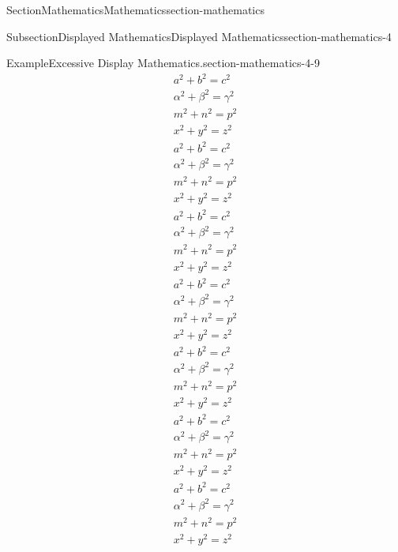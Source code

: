 \documentclass[twoside,10pt,]{article}
\numberwithin{equation}{section}
\begin{document}
\begin{sectionptx}{Section}{Mathematics}{}{Mathematics}{}{}{section-mathematics}
\begin{subsectionptx}{Subsection}{Displayed Mathematics}{}{Displayed Mathematics}{}{}{section-mathematics-4}
\begin{example}{Example}{Excessive Display Mathematics.}{section-mathematics-4-9}
\begin{gather}
a^2+b^2=c^2\label{section-mathematics-4-9-2-2-10}\\
\alpha^2+\beta^2=\gamma^2\label{section-mathematics-4-9-2-2-11}\\
m^2+n^2=p^2\label{section-mathematics-4-9-2-2-12}\\
x^2+y^2=z^2\label{section-mathematics-4-9-2-2-13}\\
a^2+b^2=c^2\label{section-mathematics-4-9-2-2-14}\\
\alpha^2+\beta^2=\gamma^2\label{section-mathematics-4-9-2-2-15}\\
m^2+n^2=p^2\label{section-mathematics-4-9-2-2-16}\\
x^2+y^2=z^2\label{section-mathematics-4-9-2-2-17}\\
a^2+b^2=c^2\label{section-mathematics-4-9-2-2-18}\\
\alpha^2+\beta^2=\gamma^2\label{section-mathematics-4-9-2-2-19}\\
m^2+n^2=p^2\label{section-mathematics-4-9-2-2-20}\\
x^2+y^2=z^2\label{section-mathematics-4-9-2-2-21}\\
a^2+b^2=c^2\label{section-mathematics-4-9-2-2-22}\\
\alpha^2+\beta^2=\gamma^2\label{section-mathematics-4-9-2-2-23}\\
m^2+n^2=p^2\label{section-mathematics-4-9-2-2-24}\\
x^2+y^2=z^2\label{section-mathematics-4-9-2-2-25}\\
a^2+b^2=c^2\label{section-mathematics-4-9-2-2-26}\\
\alpha^2+\beta^2=\gamma^2\label{section-mathematics-4-9-2-2-27}\\
m^2+n^2=p^2\label{section-mathematics-4-9-2-2-28}\\
x^2+y^2=z^2\label{section-mathematics-4-9-2-2-29}\\
a^2+b^2=c^2\label{section-mathematics-4-9-2-2-30}\\
\alpha^2+\beta^2=\gamma^2\label{section-mathematics-4-9-2-2-31}\\
m^2+n^2=p^2\label{section-mathematics-4-9-2-2-32}\\
x^2+y^2=z^2\label{section-mathematics-4-9-2-2-33}\\
a^2+b^2=c^2\label{section-mathematics-4-9-2-2-34}\\
\alpha^2+\beta^2=\gamma^2\label{section-mathematics-4-9-2-2-35}\\
m^2+n^2=p^2\label{section-mathematics-4-9-2-2-36}\\
x^2+y^2=z^2\label{section-mathematics-4-9-2-2-37}\\

\end{gather}
\end{example}
\end{subsectionptx}
\end{sectionptx}
\end{document}
